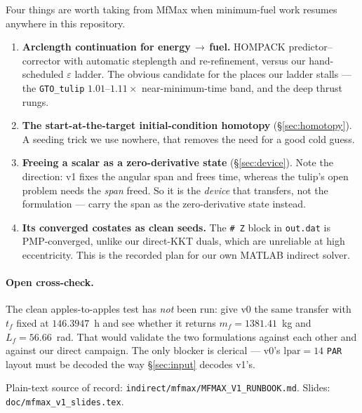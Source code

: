 \documentclass[11pt]{article}
\newcommand{\code}[1]{\texttt{\small #1}}
\newcommand{\file}[1]{\texttt{\small #1}}
\newcommand{\Lf}{L_f}
\begin{document}
Four things are worth taking from MfMax when minimum-fuel work resumes
anywhere in this repository.

\begin{enumerate}
\item \textbf{Arclength continuation for energy$\,\to\,$fuel.} HOMPACK
      predictor--corrector with automatic steplength and re-refinement, versus
      our hand-scheduled $\varepsilon$ ladder. The obvious candidate for the
      places our ladder stalls --- the \file{GTO\_tulip} $1.01$--$1.11\times$
      near-minimum-time band, and the deep thrust rungs.
\item \textbf{The start-at-the-target initial-condition homotopy}
      (\S\ref{sec:homotopy}). A seeding trick we use nowhere, that removes the
      need for a good cold guess.
\item \textbf{Freeing a scalar as a zero-derivative state}
      (\S\ref{sec:device}). Note the direction: v1 fixes the angular span and
      frees time, whereas the tulip's open problem needs the \emph{span}
      freed. So it is the \emph{device} that transfers, not the formulation
      --- carry the span as the zero-derivative state instead.
\item \textbf{Its converged costates as clean seeds.} The \code{\# Z} block in
      \file{out.dat} is PMP-converged, unlike our direct-KKT duals, which are
      unreliable at high eccentricity. This is the recorded plan for our own
      MATLAB indirect solver.
\end{enumerate}

\paragraph{Open cross-check.} The clean apples-to-apples test has \emph{not}
been run: give v0 the same transfer with $t_f$ fixed at $146.3947$~h and see
whether it returns $m_f = 1381.41$~kg and $\Lf = 56.66$~rad. That would
validate the two formulations against each other and against our direct
campaign. The only blocker is clerical --- v0's $\mathrm{lpar} = 14$
\code{PAR} layout must be decoded the way \S\ref{sec:input} decodes v1's.

\vfill
\begin{center}\small
Plain-text source of record:
\file{indirect/mfmax/MFMAX\_V1\_RUNBOOK.md}. \quad
Slides: \file{doc/mfmax\_v1\_slides.tex}.
\end{center}
\end{document}
